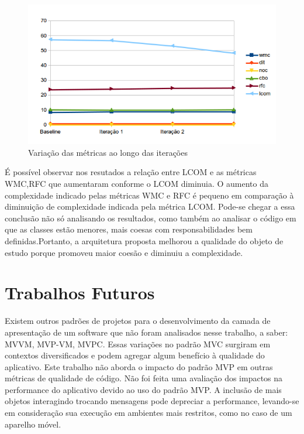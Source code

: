 \begin{figure}[htb]
	\label{fig:allmetrics}
	\caption{Variação das métricas ao longo das iterações}
	\begin{center}
		\includegraphics{img/allmetrics}
	\end{center}
\end{figure}


É possível observar nos resutados a relação entre LCOM e as métricas 
WMC,RFC que aumentaram conforme o LCOM diminuia. O aumento da complexidade
indicado pelas métricas WMC e RFC é pequeno em comparação à diminuição de
complexidade indicada pela métrica LCOM. Pode-se chegar a essa conclusão não só
analisando os resultados, como também ao analisar o código em que as classes
estão menores, mais coesas com responsabilidades bem definidas.Portanto, a
arquitetura proposta melhorou a qualidade do objeto de estudo porque promoveu
maior coesão e diminuiu a complexidade.

 
\section{Trabalhos Futuros}

Existem outros padrões de projetos para o desenvolvimento da camada de
apresentação de um software que não foram analisados nesse trabalho, a saber: 
MVVM, MVP-VM, MVPC. Essas variações no padrão MVC surgiram em contextos
diversificados e podem agregar algum benefício à qualidade do aplicativo.
Este trabalho não aborda o impacto do padrão MVP em outras métricas de qualidade
de código.
Não foi feita uma avaliação dos impactos na performance do aplicativo devido ao
uso do padrão MVP. A inclusão de mais objetos interagindo trocando mensagens
pode depreciar a performance, levando-se em consideração sua execução em
ambientes mais restritos, como no caso de um aparelho móvel.